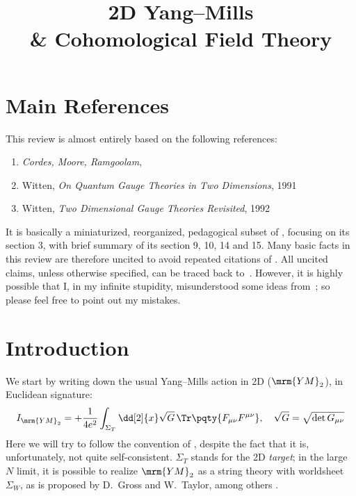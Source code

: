 \documentclass[a4paper
	,10pt
]{article}
\title{2D Yang--Mills \\ \& Cohomological Field Theory}
\newcommand{\YM}{{\ensuremath{\mrm{YM}_2}}\xspace}
\begin{document}
\maketitle
{}
\thispagestyle{empty}


\setlength{\parskip}{.1\baselineskip}
\tableofcontents
\setlength{\parskip}{\parskipnorm}

\section*{Main References}
	This review is almost entirely based on the following references:
	\begin{enumerate}[
		noitemsep
		,labelindent=\parindent
		,align=left
		,leftmargin=*
	]
	\item[\cite{Cordes:1994fc}] \textit{Cordes, Moore, Ramgoolam}, 
	\item[\cite{Witten:1991we}] Witten, \textit{On Quantum Gauge Theories in Two Dimensions}, 1991
	\item[\cite{Witten:1992xu}] Witten, \textit{Two Dimensional Gauge Theories Revisited}, 1992
	\end{enumerate}
	It is basically a miniaturized, reorganized, pedagogical subset of \cite{Cordes:1994fc}, focusing on its section 3, with brief summary of its section 9, 10, 14 and 15. Many basic facts in this review are therefore uncited to avoid repeated citations of \cite{Cordes:1994fc}. All uncited claims, unless otherwise specified, can be traced back to~\cite{Cordes:1994fc}. However, it is highly possible that I, in my infinite stupidity, misunderstood some ideas from~\cite{Cordes:1994fc}; so please feel free to point out my mistakes.
\section{Introduction}
	We start by writing down the usual Yang--Mills action in 2D (\YM), in Euclidean signature:
	\begin{equation}
		I_{\YM}
		= +\frac{1}{4e^2}
			\int_{\Sigma_T} \dd[2]{x}
			\sqrt{G}
			\,\Tr \pqty{F_{\mu\nu} F^{\mu\nu}},
	\quad
		\sqrt{G} = \sqrt{\det G_{\mu\nu}}
	\end{equation}
	Here we will try to follow the convention of \cite{Cordes:1994fc}, despite the fact that it is, unfortunately, not quite self-consistent. $\Sigma_T$ stands for the 2D \textit{target}; in the large $N$ limit, it is possible to realize \YM as a string theory with worldsheet $\Sigma_W$, as is proposed by D.~Gross and W.~Taylor, among others \cite{Gross:1992tu,Gross:1993hu,Gross:1993yt}. 
	
\end{document}
